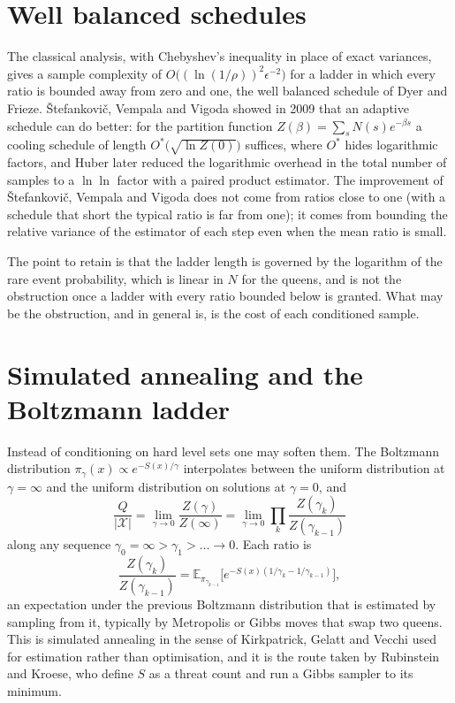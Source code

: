 \documentclass[11pt,twoside,openany]{book}
\theoremstyle{plain}
\theoremstyle{definition}
\theoremstyle{remark}
\newcommand{\EE}{\mathbb{E}}
\newcommand{\cX}{\mathcal{X}}
\begin{document}
\section{Well balanced schedules}

The classical analysis, with Chebyshev's inequality in place of exact variances, gives a sample complexity of $O\big( (\ln(1/\rho))^2 \epsilon^{-2} \big)$ for a ladder in which every ratio is bounded away from zero and one, the well balanced schedule of Dyer and Frieze. \v{S}tefankovi\v{c}, Vempala and Vigoda showed in 2009 that an adaptive schedule can do better: for the partition function $Z(\beta) = \sum_s N(s) e^{-\beta s}$ a cooling schedule of length $O^*\big( \sqrt{\ln Z(0)} \big)$ suffices, where $O^*$ hides logarithmic factors, and Huber \cite{Huber} later reduced the logarithmic overhead in the total number of samples to a $\ln \ln$ factor with a paired product estimator. The improvement of \v{S}tefankovi\v{c}, Vempala and Vigoda does not come from ratios close to one (with a schedule that short the typical ratio is far from one); it comes from bounding the relative variance of the estimator of each step even when the mean ratio is small.

The point to retain is that the ladder length is governed by the logarithm of the rare event probability, which is linear in $N$ for the queens, and is not the obstruction once a ladder with every ratio bounded below is granted. What may be the obstruction, and in general is, is the cost of each conditioned sample.

\section{Simulated annealing and the Boltzmann ladder}

Instead of conditioning on hard level sets one may soften them. The Boltzmann distribution $\pi_\gamma(x) \propto e^{-S(x)/\gamma}$ interpolates between the uniform distribution at $\gamma = \infty$ and the uniform distribution on solutions at $\gamma = 0$, and
\[
\frac{Q}{|\cX|} = \lim_{\gamma \to 0} \frac{Z(\gamma)}{Z(\infty)} = \lim_{\gamma \to 0} \prod_{k} \frac{Z(\gamma_k)}{Z(\gamma_{k-1})}
\]
along any sequence $\gamma_0 = \infty > \gamma_1 > \dots \to 0$. Each ratio is
\[
\frac{Z(\gamma_k)}{Z(\gamma_{k-1})} = \EE_{\pi_{\gamma_{k-1}}}\Big[ e^{-S(x)(1/\gamma_k - 1/\gamma_{k-1})} \Big] ,
\]
an expectation under the previous Boltzmann distribution that is estimated by sampling from it, typically by Metropolis or Gibbs moves that swap two queens. This is simulated annealing in the sense of Kirkpatrick, Gelatt and Vecchi used for estimation rather than optimisation, and it is the route taken by Rubinstein and Kroese, who define $S$ as a threat count and run a Gibbs sampler to its minimum.
\end{document}
